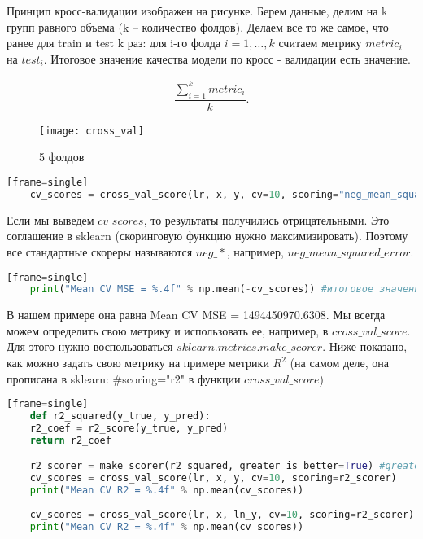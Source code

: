 	Принцип кросс-валидации изображен на рисунке. Берем данные, делим на k групп равного объема (k -- количество фолдов). Делаем все то же самое, что ранее для train и test k раз: для i-го фолда $ i = 1,\ldots,k $ считаем метрику $ metric_i  $ на $ test_i $. Итоговое значение качества модели по кросс - валидации есть значение.
	
$$\begin{gathered} 
\dfrac{\sum\limits_{i =1}^kmetric_i}{k}.
\end{gathered} $$

\begin{figure}[h]
  \caption{5 фолдов}
  \centering
    \texttt{[image: cross\_val]}
\end{figure}

\begin{lstlisting}[language=Python][frame=single]
	cv_scores = cross_val_score(lr, x, y, cv=10, scoring="neg_mean_squared_error")
\end{lstlisting}

	Если мы выведем $ cv\_scores  $, то результаты получились отрицательными. Это соглашение в sklearn (скоринговую функцию нужно максимизировать). Поэтому все стандартные скореры называются $ neg\_* $, например, $ neg\_mean\_squared\_error  $.
	
\begin{lstlisting}[language=Python][frame=single]
	print("Mean CV MSE = %.4f" % np.mean(-cv_scores)) #итоговое значение качества модели по кросс - валидации
\end{lstlisting}

	В нашем примере она равна Mean CV MSE = 1494450970.6308. Мы всегда можем определить свою метрику и использовать ее, например, в $ cross\_val\_score $. Для этого нужно воспользоваться $ sklearn.metrics.make\_scorer $. Ниже показано, как можно задать свою метрику на примере метрики $ R^2 $ (на самом деле, она прописана в sklearn: $ \# $scoring="r2" в функции $ cross\_val\_score $)
	
\begin{lstlisting}[language=Python][frame=single]
	def r2_squared(y_true, y_pred):
    r2_coef = r2_score(y_true, y_pred)
    return r2_coef

	r2_scorer = make_scorer(r2_squared, greater_is_better=True) #greater_is_better влияет на знаки метрик в cv_scores
	cv_scores = cross_val_score(lr, x, y, cv=10, scoring=r2_scorer) 
	print("Mean CV R2 = %.4f" % np.mean(cv_scores))
	
	cv_scores = cross_val_score(lr, x, ln_y, cv=10, scoring=r2_scorer) 
	print("Mean CV R2 = %.4f" % np.mean(cv_scores))
\end{lstlisting}


